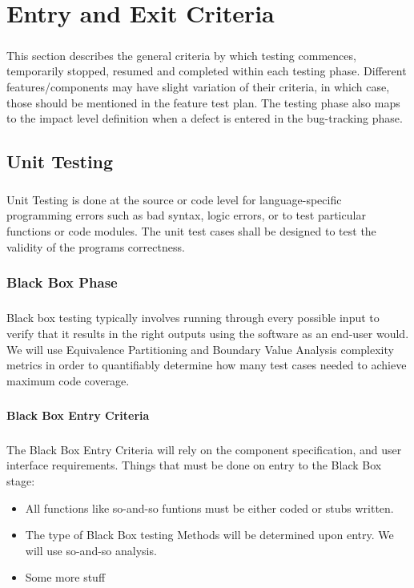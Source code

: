 \documentclass[a4paper,10pt]{scrreprt}
\begin{document}
\chapter{Entry and Exit Criteria}
\paragraph{}
This section describes the general criteria by which testing commences, temporarily stopped, resumed and completed within each testing phase. Different features/components may have slight variation of their criteria, in which case, those should be mentioned in the feature test
plan. The testing phase also maps to the impact level definition when a defect is entered in the bug-tracking phase.
\section{Unit Testing}
\paragraph{}
Unit Testing is done at the source or code level for language-specific programming errors such as bad syntax, logic errors, or to test particular functions or code modules. The unit test cases shall be designed to test the validity of the programs correctness.
\subsection{Black Box Phase}
\paragraph{}
Black box testing typically involves running through every possible input to verify that it results in the right outputs using the software as an end-user would. We will use Equivalence Partitioning and Boundary Value Analysis complexity metrics in order to quantifiably determine how
many test cases needed to achieve maximum code coverage.
\paragraph{}
\textbf{Black Box Entry Criteria}
\paragraph{}
The Black Box Entry Criteria will rely on the component specification, and user interface requirements. Things that must be done on entry to the Black Box stage:
\begin{itemize}
	\item All functions like so-and-so funtions must be either coded or stubs written.
	\item The type of Black Box testing Methods will be determined upon entry. We will use so-and-so analysis.
	\item Some more stuff
\end{itemize}
\end{document}
